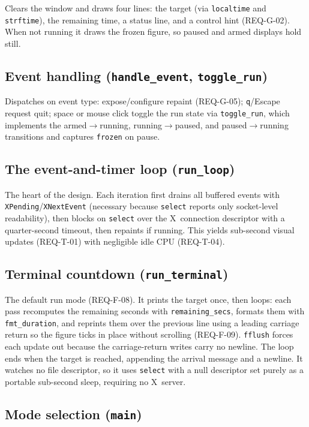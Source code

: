 \documentclass[12pt]{article}
\newcommand{\code}[1]{\texttt{#1}}
\begin{document}
Clears the window and draws four lines: the target (via \code{localtime}
and \code{strftime}), the remaining time, a status line, and a control
hint (REQ-G-02).  When not running it draws the frozen figure, so paused
and armed displays hold still.

\subsection{Event handling (\code{handle\_event}, \code{toggle\_run})}

Dispatches on event type: expose/configure repaint (REQ-G-05);
\code{q}/Escape request quit; space or mouse click toggle the run state via
\code{toggle\_run}, which implements the armed$\rightarrow$running,
running$\rightarrow$paused, and paused$\rightarrow$running transitions and
captures \code{frozen} on pause.

\subsection{The event-and-timer loop (\code{run\_loop})}

The heart of the design.  Each iteration first drains all buffered events
with \code{XPending}/\code{XNextEvent} (necessary because \code{select}
reports only socket-level readability), then blocks on \code{select} over
the X~connection descriptor with a quarter-second timeout, then repaints if
running.  This yields sub-second visual updates (REQ-T-01) with negligible
idle CPU (REQ-T-04).

\subsection{Terminal countdown (\code{run\_terminal})}

The default run mode (REQ-F-08).  It prints the target once, then loops:
each pass recomputes the remaining seconds with \code{remaining\_secs},
formats them with \code{fmt\_duration}, and reprints them over the previous
line using a leading carriage return so the figure ticks in place without
scrolling (REQ-F-09).  \code{fflush} forces each update out because the
carriage-return writes carry no newline.  The loop ends when the target is
reached, appending the arrival message and a newline.  It watches no file
descriptor, so it uses \code{select} with a null descriptor set purely as a
portable sub-second sleep, requiring no X~server.

\subsection{Mode selection (\code{main})}
\end{document}
